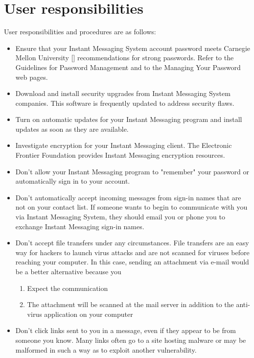 \section{User responsibilities}\label{sec:user-responsibilities}
User responsibilities and procedures are as follows:
\begin{itemize}
    \item Ensure that your Instant Messaging System account password meets Carnegie Mellon
    University [\cite{shay2010encountering}] recommendations for strong passwords.
    Refer to the Guidelines for Password Management and to the Managing Your Password web pages.
    \item Download and install security upgrades from Instant Messaging System companies.
    This software is frequently updated to address security flaws.
    \item Turn on automatic updates for your Instant Messaging program and install updates as soon as they are available.
    \item Investigate encryption for your Instant Messaging client.
    The Electronic Frontier Foundation provides Instant Messaging encryption resources.
    \item Don't allow your Instant Messaging program to "remember" your password or automatically sign in to your account.
    \item Don't automatically accept incoming messages from sign-in names that are not on your contact list.
    If someone wants to begin to communicate with you via Instant Messaging System,
    they should email you or phone you to exchange Instant Messaging sign-in names.
    \item Don't accept file transfers under any circumstances.
    File transfers are an easy way for hackers to launch virus attacks and are not scanned for viruses before reaching your computer.
    In this case, sending an attachment via e-mail would be a better alternative because you
    \begin{enumerate}
        \item Expect the communication
        \item The attachment will be scanned at the mail server in addition to the anti-virus application on your computer
    \end{enumerate}
    \item Don't click links sent to you in a message, even if they appear to be from someone you know.
    Many links often go to a site hosting malware or may be malformed in such a way as to exploit another vulnerability.

\end{itemize}
